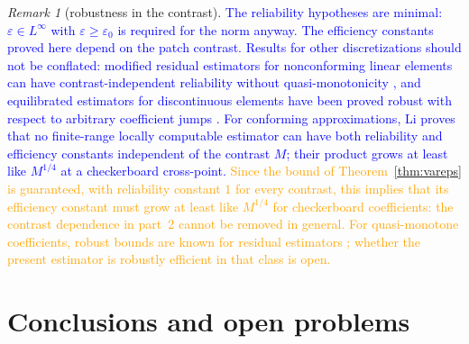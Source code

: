 \documentclass[11pt]{article}
\newcommand{\rev}[1]{\textcolor{blue}{#1}}
\newcommand{\refe}[1]{\textcolor{orange}{#1}}   %
\newcommand{\eps}{\varepsilon}
\theoremstyle{plain}
\theoremstyle{remark}
\newtheorem{remark}[theorem]{Remark}
\numberwithin{equation}{section}
\begin{document}
\begin{remark}[robustness in the contrast]
\rev{The reliability hypotheses are minimal: $\eps\in L^\infty$ with $\eps\ge\eps_0$ is required for the
norm anyway. The efficiency constants proved here depend on the patch contrast. Results for other
discretizations should not be conflated: modified residual estimators for nonconforming linear
elements can have contrast-independent reliability without quasi-monotonicity \cite{CHZ}, and
equilibrated estimators for discontinuous elements have been proved robust with respect to arbitrary
coefficient jumps \cite{CCZ}. For conforming approximations, Li \cite{Li26} proves that no
finite-range locally computable estimator can have both reliability and efficiency constants
independent of the contrast $M$; their product grows at least like $M^{1/4}$ at a checkerboard
cross-point.} \refe{Since the bound of Theorem~\ref{thm:vareps} is guaranteed, with reliability
constant $1$ for every contrast, this implies that its efficiency constant must grow at least like
$M^{1/4}$ for checkerboard coefficients: the contrast dependence in part~2 cannot be removed in general.
For quasi-monotone coefficients, robust bounds are known for residual estimators \cite{BV00,Pe02};
whether the present estimator is robustly efficient in that class is open.}
\end{remark}



\section{Conclusions and open problems}\label{sec:concl}
\end{document}
